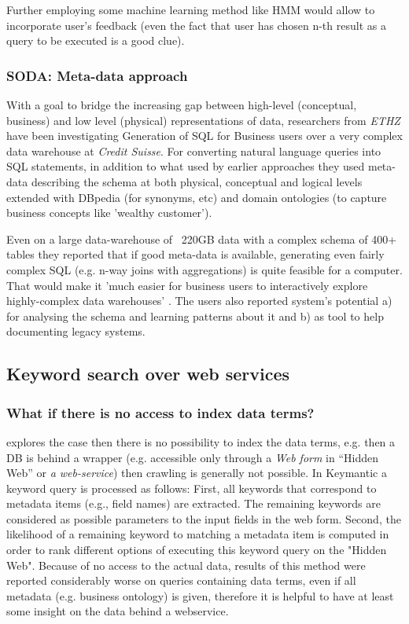 Further employing some machine learning method like HMM\cite{kw_cleaning_hmm} would allow to incorporate user's feedback (even the fact that user has chosen n-th result as a query to be executed is a good clue).


\subsubsection*{SODA: Meta-data approach}

With a goal to bridge the increasing gap between high-level (conceptual, business) and low level (physical) representations of data, researchers from \textit{ETHZ} have been investigating Generation of SQL for Business users over a very complex data warehouse at \textit{Credit Suisse}.  For converting natural language queries 
 into SQL statements, in addition to what used by earlier approaches they used meta-data describing the schema at both physical, conceptual and logical levels extended with DBpedia (for synonyms, etc) and domain ontologies (to capture business concepts like 'wealthy customer').

Even on a large data-warehouse of ~220GB data with a complex schema of 400+ tables they reported that if good meta-data is available, generating even fairly complex SQL  (e.g. n-way joins with aggregations) is quite feasible for a computer. That would make it 'much easier for business users to interactively explore highly-complex data warehouses' \cite[p.932]{ethz2012}. The users also reported system's potential a) for analysing the schema and learning patterns about it and b) as tool to help documenting legacy systems.


\subsection{Keyword search over web services}


\subsubsection*{What if there is no access to index data terms?}
\cite{Keymantic10, semantics_without_access} explores the case then there is no possibility to index the data terms, e.g. then a DB is behind a wrapper (e.g. accessible only through a \textit{Web form} in “Hidden Web” or \textit{a web-service}) then crawling is generally not possible.
%
In Keymantic\cite{Keymantic10} a keyword query is processed as follows: First, all keywords that  correspond to metadata items (e.g., field names) are extracted. The remaining keywords are considered as possible parameters to the input fields in the web form. Second, the likelihood of a remaining keyword to matching a metadata item is computed in order to rank different options of executing this keyword query on the "Hidden Web"\cite[p.942]{ethz2012}. Because of no access to the actual data, results of this method were reported considerably worse on queries containing data terms, even if all metadata (e.g. business ontology) is given\cite{ethz2012}, therefore it is helpful to have at least some insight on the data behind a webservice.
